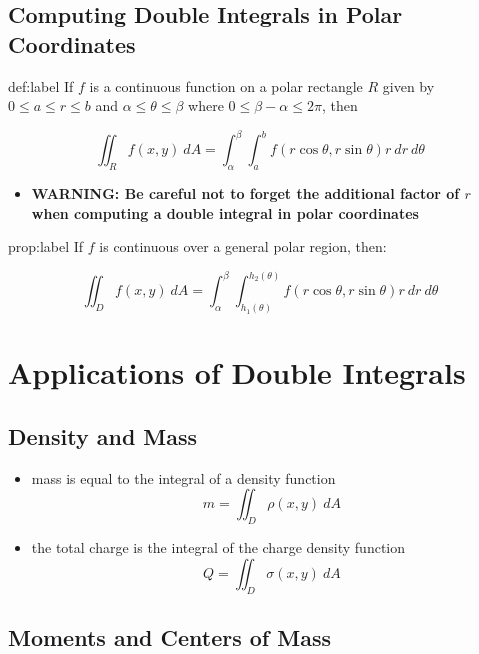 \documentclass{package/notes}
\begin{document}
\subsection{Computing Double Integrals in Polar Coordinates}

\begin{definition}{def:label}
	If $f$ is a continuous function on a polar rectangle $R$ given by $0\le a\le r\le b$ and $\alpha\le\theta\le\beta$ where $0\le\beta-\alpha\le2\pi$, then

	$$\iint_Rf(x,y)\:dA=\int_\alpha^\beta\int_a^bf(r\cos\theta, r\sin\theta)r\:dr\:d\theta$$
\end{definition}

\begin{itemize}
	\item \textbf{WARNING: Be careful not to forget the additional factor of $r$ when computing a double integral in polar coordinates}
\end{itemize}

\begin{definition}{prop:label}
	If $f$ is continuous over a general polar region, then:

	$$\iint_Df(x,y)\:dA =\int_\alpha^\beta\int_{h_1(\theta)}^{h_2(\theta)}f(r\cos\theta, r\sin\theta)r\:dr\:d\theta$$
\end{definition}



\section{Applications of Double Integrals}


\subsection{Density and Mass}

\begin{itemize}
	\item mass is equal to the integral of a density function $$m = \iint_D\rho(x,y)\:dA$$
	\item the total charge is the integral of the charge density function $$Q=\iint_D\sigma(x,y)\:dA$$
\end{itemize}


\subsection{Moments and Centers of Mass}
\end{document}

